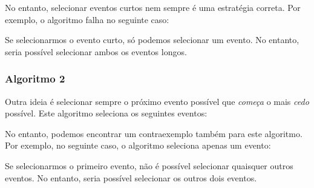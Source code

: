 No entanto, selecionar eventos curtos nem sempre
é uma estratégia correta. Por exemplo, o algoritmo falha
no seguinte caso:
\begin{center}
\end{center}
Se selecionarmos o evento curto, só podemos selecionar um evento.
No entanto, seria possível selecionar ambos os eventos longos.

\subsubsection*{Algoritmo 2}

Outra ideia é selecionar sempre o próximo evento possível
que \emph{começa} o mais \emph{cedo} possível.
Este algoritmo seleciona os seguintes eventos:
\begin{center}
\end{center}

No entanto, podemos encontrar um contraexemplo
também para este algoritmo.
Por exemplo, no seguinte caso,
o algoritmo seleciona apenas um evento:
\begin{center}
\end{center}
Se selecionarmos o primeiro evento, não é possível
selecionar quaisquer outros eventos.
No entanto, seria possível selecionar os
outros dois eventos.

